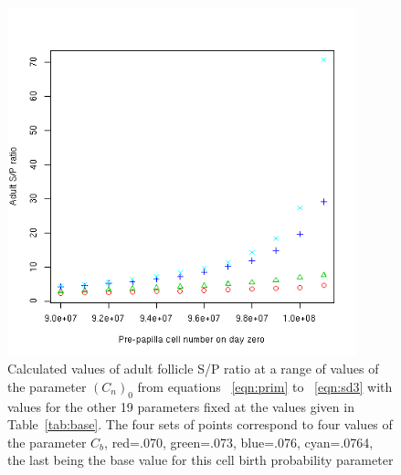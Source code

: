 %

\begin{figure}[!h]
  \centering
   \includegraphics[width=0.9\textwidth]{zcellnosop.png}
  \caption{Calculated values of adult follicle S/P ratio at a range of values of the parameter $(C_{n})_{0}$  from equations ~\ref{eqn:prim} to ~\ref{eqn:sd3} with values for the other 19  parameters fixed at the values given in Table~\ref{tab:base}. The four sets of points correspond to four values of the parameter $C_{b}$, red=.070, green=.073, blue=.076, cyan=.0764, the last being the base value for this cell birth probability parameter}
  \label{fig:zcellnosop}
\end{figure}

%

